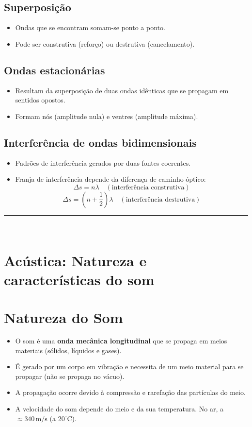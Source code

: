 \documentclass[a4paper,12pt]{article}
\begin{document}
\begin{multicols}{2}
\subsection{Superposição}
\begin{itemize}
    \item Ondas que se encontram somam-se ponto a ponto.
    \item Pode ser construtiva (reforço) ou destrutiva (cancelamento).
\end{itemize}

\subsection{Ondas estacionárias}
\begin{itemize}
    \item Resultam da superposição de duas ondas idênticas que se propagam em sentidos opostos.
    \item Formam nós (amplitude nula) e ventres (amplitude máxima).
\end{itemize}

\subsection{Interferência de ondas bidimensionais}
\begin{itemize}
    \item Padrões de interferência gerados por duas fontes coerentes.
    \item Franja de interferência depende da diferença de caminho óptico:
    \[
        \Delta s = n\lambda \quad (\text{interferência construtiva})
    \]
    \[
        \Delta s = \left(n + \frac{1}{2}\right)\lambda \quad (\text{interferência destrutiva})
    \]
\end{itemize}

\noindent\rule{\linewidth}{1pt}\\

\section{Acústica: Natureza e características do som}

\section{Natureza do Som}
\begin{itemize}
    \item O som é uma \textbf{onda mecânica longitudinal} que se propaga em meios materiais (sólidos, líquidos e gases).
    \item É gerado por um corpo em vibração e necessita de um meio material para se propagar (não se propaga no vácuo).
    \item A propagação ocorre devido à compressão e rarefação das partículas do meio.
    \item A velocidade do som depende do meio e da sua temperatura. No ar, a $\approx 340\,\text{m/s}$ (a $20^\circ$C).
\end{itemize}


\end{multicols}
\end{document}

